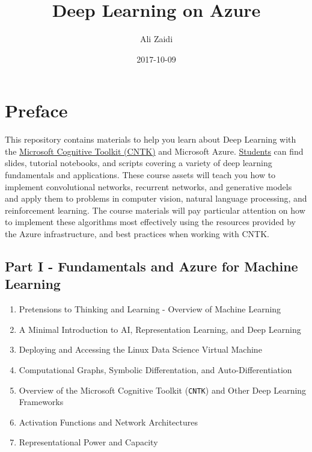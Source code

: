 \documentclass[]{book}
\title{Deep Learning on Azure}
\author{Ali Zaidi}
\date{2017-10-09}
\providecommand{\tightlist}{%
  \setlength{\itemsep}{0pt}\setlength{\parskip}{0pt}}
\theoremstyle{definition}
\theoremstyle{definition}
\theoremstyle{definition}
\theoremstyle{remark}
\begin{document}
\maketitle

{
\setcounter{tocdepth}{1}
\tableofcontents
}
\chapter{Preface}\label{preface}

This repository contains materials to help you learn about Deep Learning
with the \href{https://github.com/microsoft/cntk}{Microsoft Cognitive
Toolkit (CNTK)} and Microsoft Azure. \href{./Students}{Students} can
find slides, tutorial notebooks, and scripts covering a variety of deep
learning fundamentals and applications. These course assets will teach
you how to implement convolutional networks, recurrent networks, and
generative models and apply them to problems in computer vision, natural
language processing, and reinforcement learning. The course materials
will pay particular attention on how to implement these algorithms most
effectively using the resources provided by the Azure infrastructure,
and best practices when working with CNTK.

\section{Part I - Fundamentals and Azure for Machine
Learning}\label{part-i---fundamentals-and-azure-for-machine-learning}

\begin{enumerate}
\def\labelenumi{\arabic{enumi}.}
\tightlist
\item
  Pretensions to Thinking and Learning - Overview of Machine Learning
\item
  A Minimal Introduction to AI, Representation Learning, and Deep
  Learning
\item
  Deploying and Accessing the Linux Data Science Virtual Machine
\item
  Computational Graphs, Symbolic Differentation, and
  Auto-Differentiation
\item
  Overview of the Microsoft Cognitive Toolkit (\texttt{CNTK}) and Other
  Deep Learning Frameworks
\item
  Activation Functions and Network Architectures
\item
  Representational Power and Capacity
\end{enumerate}
\end{document}
